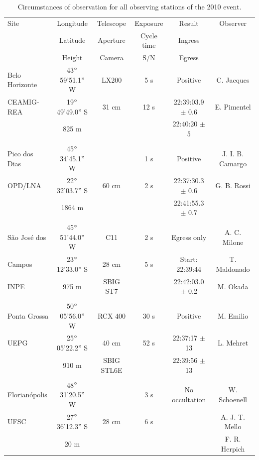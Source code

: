 \documentclass[useAMS,usenatbib]{mn2e}
\begin{document}
\begin{table}
 \centering
 \begin{minipage}{140mm}
  \caption{Circumstances of observation for all observing stations of the 2010 event. \label{Tab: obs-2010}}
  \begin{tabular}{@{}lccccc}
  \hline
     Site & Longitude & Telescope & Exposure & Result & Observer  \\
          & Latitude  & Aperture  & Cycle time & Ingress & \\          
          & Height    & Camera    &    S/N    & Egress    & \\          
\hline
 Belo Horizonte & 43$\hbox{$^\circ$}$59'51.1'' W & LX200 & 5 s & Positive & C. Jacques  \\
 CEAMIG-REA &19$\hbox{$^\circ$}$49'49.0'' S & 31 cm & 12 s & 22:39:03.9 $\pm$ 0.6 &  E. Pimentel \\
            & 825 m                &       &     & 22:40:20 $\pm$ 5 &   \\
 & & & & & \\
 Pico dos Dias    & 45$\hbox{$^\circ$}$34'45.1'' W &       & 1 s & Positive & J. I. B. Camargo \\
 OPD/LNA    &22$\hbox{$^\circ$}$32'03.7'' S & 60 cm & 2 s & 22:37:30.3 $\pm$ 0.6 &  G. B. Rossi \\
            & 1864 m               &       &     & 22:41:55.3 $\pm$ 0.7 &              \\
 & & & & & \\
 S\~ao Jos\'e dos       & 45$\hbox{$^\circ$}$51'44.0'' W &  C11  & 2 s & Egress only & A. C. Milone\\
 Campos       &23$\hbox{$^\circ$}$12'33.0'' S & 28 cm & 5 s & Start: 22:39:44 & T. Maldonado\\
 INPE      & 975 m                & SBIG ST7 &     & 22:42:03.0 $\pm$ 0.2 & M. Okada    \\
 & & & & & \\
 Ponta Grossa       & 50$\hbox{$^\circ$}$05'56.0'' W & RCX 400 &30 s & Positive & M. Emilio   \\
 UEPG       &25$\hbox{$^\circ$}$05'22.2'' S & 40 cm & 52 s & 22:37:17 $\pm$ 13 & L. Mehret   \\
            & 910 m                & SBIG STL6E &     & 22:39:56 $\pm$ 13 & \\
 & & & & & \\
 Florian\'opolis       & 48$\hbox{$^\circ$}$31'20.5'' W &       & 3 s & No occultation  & W. Schoenell\\
 UFSC       &27$\hbox{$^\circ$}$36'12.3'' S & 28 cm & 6 s&  & A. J. T. Mello\\
            & 20 m                 &       &  &         & F. R. Herpich \\
\hline
\end{tabular}
\end{minipage}
\end{table}
\end{document}
